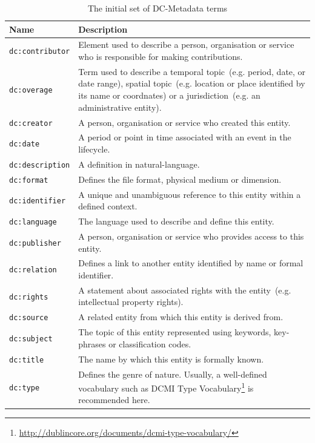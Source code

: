 \documentclass[draft,final]{vutinfth} %
\begin{document}
\begingroup
\renewcommand{\arraystretch}{2}
\begin{table}
	\begin{tabularx}{\textwidth}{l|X}
		\textbf{Name} & \textbf{Description} \\
		\hline
		\texttt{dc:contributor} & Element used to describe a person, organisation or service who is responsible for making contributions.\\
		\texttt{dc:overage} & Term used to describe a temporal topic~(e.g. period, date, or date range), spatial topic~(e.g. location or place identified by its name or coordnates) or a jurisdiction~(e.g. an administrative entity). \\
		\texttt{dc:creator} & A person, organisation or service who created this entity.\\
		\texttt{dc:date} & A period or point in time associated with an event in the lifecycle.\\
		\texttt{dc:description} & A definition in natural-language.\\
		\texttt{dc:format} & Defines the file format, physical medium or dimension.\\
		\texttt{dc:identifier} & A unique and unambiguous reference to this entity within a defined context.\\
		\texttt{dc:language} & The language used to describe and define this entity.\\
		\texttt{dc:publisher} & A person, organisation or service who provides access to this entity.\\
		\texttt{dc:relation} & Defines a link to another entity identified by name or formal identifier.\\
		\texttt{dc:rights} & A statement about associated rights with the entity~(e.g. intellectual property rights).\\
		\texttt{dc:source} & A related entity from which this entity is derived from.\\
		\texttt{dc:subject} & The topic of this entity represented using keywords, key-phrases or classification codes.\\
		\texttt{dc:title} & The name by which this entity is formally known.\\
		\texttt{dc:type} & Defines the genre of nature. Usually, a well-defined vocabulary such as DCMI Type Vocabulary\footnote{\url{http://dublincore.org/documents/dcmi-type-vocabulary/}} is recommended here.\\
	\end{tabularx}
	\caption{The initial set of DC-Metadata terms}
	\label{table:dublin_core}
\end{table}
\endgroup
\end{document}
